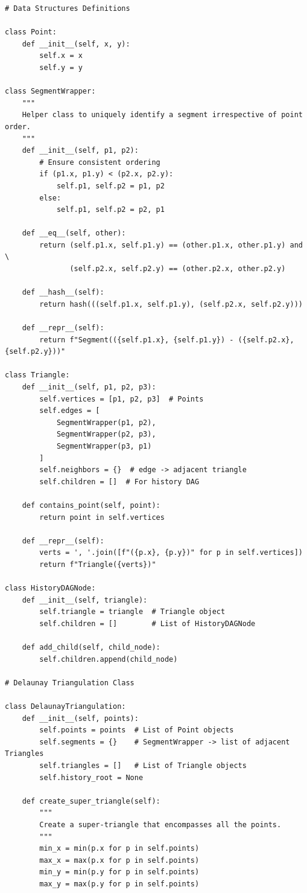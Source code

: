 \documentclass{article}
\begin{document}
\begin{verbatim}
# Data Structures Definitions

class Point:
    def __init__(self, x, y):
        self.x = x
        self.y = y

class SegmentWrapper:
    """
    Helper class to uniquely identify a segment irrespective of point order.
    """
    def __init__(self, p1, p2):
        # Ensure consistent ordering
        if (p1.x, p1.y) < (p2.x, p2.y):
            self.p1, self.p2 = p1, p2
        else:
            self.p1, self.p2 = p2, p1

    def __eq__(self, other):
        return (self.p1.x, self.p1.y) == (other.p1.x, other.p1.y) and \
               (self.p2.x, self.p2.y) == (other.p2.x, other.p2.y)

    def __hash__(self):
        return hash(((self.p1.x, self.p1.y), (self.p2.x, self.p2.y)))

    def __repr__(self):
        return f"Segment(({self.p1.x}, {self.p1.y}) - ({self.p2.x}, {self.p2.y}))"

class Triangle:
    def __init__(self, p1, p2, p3):
        self.vertices = [p1, p2, p3]  # Points
        self.edges = [
            SegmentWrapper(p1, p2),
            SegmentWrapper(p2, p3),
            SegmentWrapper(p3, p1)
        ]
        self.neighbors = {}  # edge -> adjacent triangle
        self.children = []  # For history DAG

    def contains_point(self, point):
        return point in self.vertices

    def __repr__(self):
        verts = ', '.join([f"({p.x}, {p.y})" for p in self.vertices])
        return f"Triangle({verts})"

class HistoryDAGNode:
    def __init__(self, triangle):
        self.triangle = triangle  # Triangle object
        self.children = []        # List of HistoryDAGNode

    def add_child(self, child_node):
        self.children.append(child_node)

# Delaunay Triangulation Class

class DelaunayTriangulation:
    def __init__(self, points):
        self.points = points  # List of Point objects
        self.segments = {}    # SegmentWrapper -> list of adjacent Triangles
        self.triangles = []   # List of Triangle objects
        self.history_root = None

    def create_super_triangle(self):
        """
        Create a super-triangle that encompasses all the points.
        """
        min_x = min(p.x for p in self.points)
        max_x = max(p.x for p in self.points)
        min_y = min(p.y for p in self.points)
        max_y = max(p.y for p in self.points)


\end{verbatim}
\end{document}
